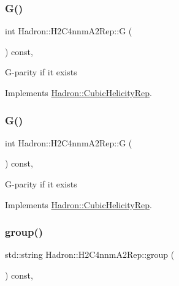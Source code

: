 \subsubsection{\texorpdfstring{G()}{G()}\hspace{0.1cm}{\footnotesize\ttfamily [1/2]}}
{\footnotesize\ttfamily int Hadron\+::\+H2\+C4nnm\+A2\+Rep\+::G (\begin{DoxyParamCaption}{ }\end{DoxyParamCaption}) const\hspace{0.3cm}{\ttfamily [inline]}, {\ttfamily [virtual]}}

G-\/parity if it exists 

Implements \mbox{\hyperlink{structHadron_1_1CubicHelicityRep_a50689f42be1e6170aa8cf6ad0597018b}{Hadron\+::\+Cubic\+Helicity\+Rep}}.

\mbox{\label{structHadron_1_1H2C4nnmA2Rep_af29cadbf7dec6e75cb6df8eed3a4a8ce}} 
\subsubsection{\texorpdfstring{G()}{G()}\hspace{0.1cm}{\footnotesize\ttfamily [2/2]}}
{\footnotesize\ttfamily int Hadron\+::\+H2\+C4nnm\+A2\+Rep\+::G (\begin{DoxyParamCaption}{ }\end{DoxyParamCaption}) const\hspace{0.3cm}{\ttfamily [inline]}, {\ttfamily [virtual]}}

G-\/parity if it exists 

Implements \mbox{\hyperlink{structHadron_1_1CubicHelicityRep_a50689f42be1e6170aa8cf6ad0597018b}{Hadron\+::\+Cubic\+Helicity\+Rep}}.

\mbox{\label{structHadron_1_1H2C4nnmA2Rep_a5a67d986be4ac8ac591051bea3159855}} 
\subsubsection{\texorpdfstring{group()}{group()}\hspace{0.1cm}{\footnotesize\ttfamily [1/3]}}
{\footnotesize\ttfamily std\+::string Hadron\+::\+H2\+C4nnm\+A2\+Rep\+::group (\begin{DoxyParamCaption}{ }\end{DoxyParamCaption}) const\hspace{0.3cm}{\ttfamily [inline]}, {\ttfamily [virtual]}}

